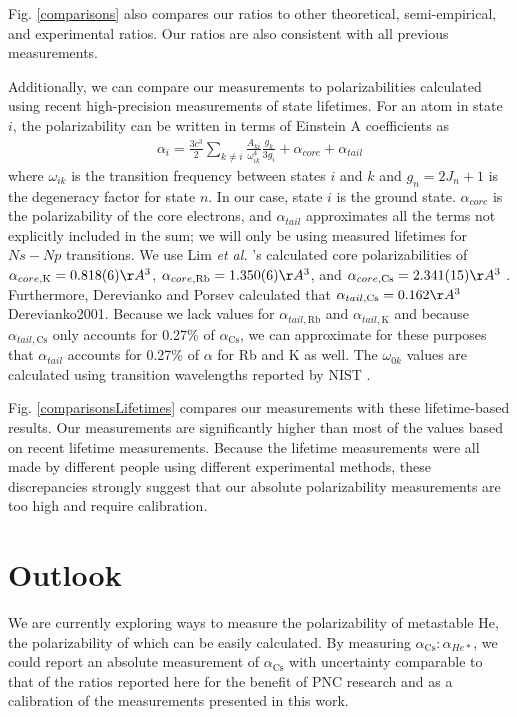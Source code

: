 \documentclass[twocolumn,prl,showpacs,superscriptaddress]{revtex4-1}   %
\newcommand{\figref}[1]{Fig. \ref{#1}}
\newcommand{\acs}{\alpha_{\textrm{Cs}}}
\newcommand{\etal}{\textit{et al. }}
\begin{document}
\figref{comparisons} also compares our ratios to other theoretical, semi-empirical, and experimental ratios. Our ratios are also consistent with all previous measurements.

Additionally, we can compare our measurements to polarizabilities calculated using recent high-precision measurements of state lifetimes. For an atom in state $i$, the polarizability can be written in terms of Einstein A coefficients as
\begin{align}
	\alpha_i = \frac{3c^3}{2} \sum_{k\neq i} 
	\frac{A_{ki}}{\omega_{ik}^4} \frac{g_k}{3g_i}
	+ \alpha_{core}
	+ \alpha_{tail}
	\label{polFromLifetimes}
\end{align}
where $\omega_{ik}$ is the transition frequency between states $i$ and $k$ and $g_n = 2J_n+1$ is the degeneracy factor for state $n$. In our case, state $i$ is the ground state. $\alpha_{core}$ is the polarizability of the core electrons, and $\alpha_{tail}$ approximates all the terms not explicitly included in the sum; we will only be using measured lifetimes for $Ns-Np$ transitions.
We use Lim \etal's calculated core polarizabilities of 
$\alpha_{core,\mathrm{K}} = 0.818(6) \AA^3$, 
$\alpha_{core,\mathrm{Rb}} = 1.350(6) \AA^3$, and 
$\alpha_{core,\mathrm{Cs}} = 2.341(15) \AA^3$ \cite{Lim2002}. 
Furthermore, Derevianko and Porsev calculated that 
$\alpha_{tail,\mathrm{Cs}} = 0.162 \AA^3$ {Derevianko2001}. Because we lack values for $\alpha_{tail,\mathrm{Rb}}$ and $\alpha_{tail,\mathrm{K}}$ and because $\alpha_{tail,\mathrm{Cs}}$ only accounts for 0.27\% of $\acs$, we can approximate for these purposes that $\alpha_{tail}$ accounts for 0.27\% of $\alpha$ for Rb and K as well. The $\omega_{0k}$ values are calculated using transition wavelengths reported by NIST \cite{NIST}. 

\figref{comparisonsLifetimes} compares our measurements with these lifetime-based results. Our measurements are significantly higher than most of the values based on recent lifetime measurements. Because the lifetime measurements were all made by different people using different experimental methods, these discrepancies strongly suggest that our absolute polarizability measurements are too high and require calibration.

\section{Outlook}

We are currently exploring ways to measure the polarizability of metastable He, the polarizability of which can be easily calculated. By measuring $\acs:\alpha_{He*}$, we could report an absolute measurement of $\acs$ with uncertainty comparable to that of the ratios reported here for the benefit of PNC research and as a calibration of the measurements presented in this work.
\end{document}
